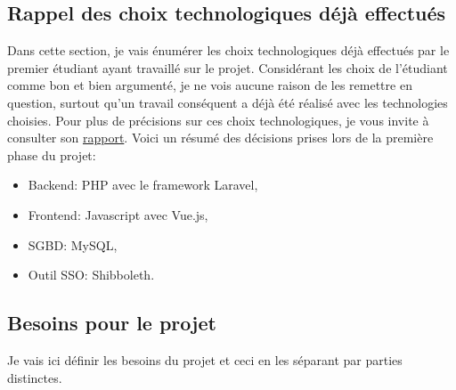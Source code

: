 \documentclass[
    iai, %
    il, %
]{heig-tb}
\begin{document}
\subsection{Rappel des choix technologiques déjà effectués}
Dans cette section, je vais énumérer les choix technologiques déjà effectués par le premier étudiant ayant travaillé sur le projet.
Considérant les choix de l'étudiant comme bon et bien argumenté, je ne vois aucune raison de les remettre en question, surtout qu'un travail conséquent a déjà été réalisé avec les technologies choisies. Pour plus de précisions sur ces choix technologiques, je vous invite à consulter son \href{TODO}{rapport}.
Voici un résumé des décisions prises lors de la première phase du projet:
\begin{itemize}
    \item Backend: PHP avec le framework Laravel,
    \item Frontend: Javascript avec Vue.js,
    \item SGBD: MySQL,
    \item Outil SSO: Shibboleth. %
\end{itemize}


\subsection{Besoins pour le projet}
Je vais ici définir les besoins du projet et ceci en les séparant par parties distinctes.
\end{document}
